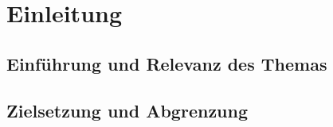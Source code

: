 \section{Einleitung}
\subsection{Einführung und Relevanz des Themas}
%

\subsection{Zielsetzung und Abgrenzung}

